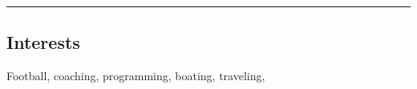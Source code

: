 \documentclass[12pt,letterpaper]{article}
\begin{document}



\hrule

\subsection*{Interests}

	Football, coaching, programming, boating, traveling,
\end{document}
